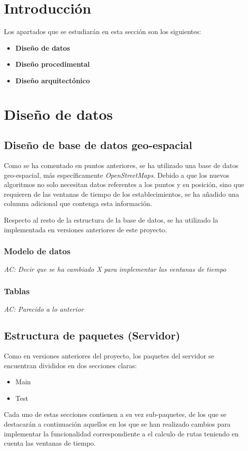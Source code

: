 
\section{Introducción}
Los apartados que se estudiarán en esta sección son los siguientes:
\begin{itemize}
\item \textbf{Diseño de datos}
\item \textbf{Diseño procedimental}
\item \textbf{Diseño arquitectónico}
\end{itemize}
\section{Diseño de datos}
\subsection{Diseño de base de datos geo-espacial}
Como se ha comentado en puntos anteriores, se ha utilizado una base de datos geo-espacial, más específicamente \textit{OpenStreetMaps}.
Debido a que los nuevos algoritmos no solo necesitan datos referentes a los puntos y su posición, sino que requieren de las ventanas de tiempo de los establecimientos, se ha añadido una columna adicional que contenga esta información.

Respecto al resto de la estructura de la base de datos, se ha utilizado la implementada en versiones anteriores de este proyecto.

\subsubsection{Modelo de datos}
\textit{AC: Decir que se ha cambiado X para implementar las ventanas de tiempo}
\subsubsection{Tablas}
\textit{AC: Parecido a lo anterior}
\subsection{Estructura de paquetes (Servidor)}
Como en versiones anteriores del proyecto, los paquetes del servidor se encuentran divididos en dos secciones claras:
\begin{itemize}
\item Main
\item Test
\end{itemize}
Cada uno de estas secciones contienen a su vez sub-paquetes, de los que se destacarán a continuación aquellos en los que se han realizado cambios para implementar la funcionalidad correspondiente a el calculo de rutas teniendo en cuenta las ventanas de tiempo.

